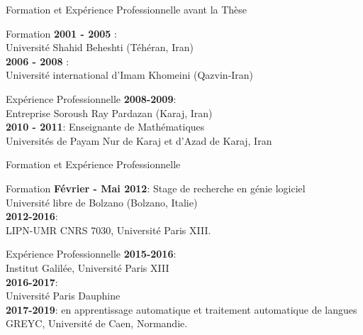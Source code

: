 \documentclass{beamer}
\newcommand{\imp}[1]{\textbf{{\color{blue}{#1}}}}
\begin{document}
{

\begin{frame}{Formation et Expérience Professionnelle avant la Thèse}

\begin{block}{Formation}
	\textbf{2001 - 2005} : \imp{Licence de Mathématique}\\
	\hspace*{1cm}Université Shahid Beheshti (Téhéran, Iran)\\
	\textbf{2006 - 2008} : \imp{Master de Mathématique} \\
	\hspace*{1cm}Université international d’Imam Khomeini (Qazvin-Iran)
\end{block}
\begin{block}{Expérience Professionnelle}
\textbf{2008-2009}: \imp{Programmatrice et conceptrice de BDD}\\
\hspace*{1cm} Entreprise Soroush Ray Pardazan (Karaj, Iran)\\
\textbf{2010 - 2011}: Enseignante de Mathématiques \\
 \hspace*{1cm} Universités de Payam Nur de Karaj et d'Azad de Karaj, Iran
\end{block}

\end{frame}

\begin{frame}{Formation et Expérience Professionnelle}

\begin{block}{Formation}
\textbf{Février - Mai 2012}: Stage de recherche en génie logiciel\\
\hspace*{1cm}Université libre de Bolzano (Bolzano, Italie)\\
\textbf{2012-2016}: \imp{Doctorat en Informatique}\\
\hspace*{1cm}LIPN-UMR CNRS 7030, Université Paris XIII.
\end{block}

\begin{block}{Expérience Professionnelle}
\textbf{2015-2016}: \imp{ATER}\\
 \hspace*{1cm}Institut Galilée, Université Paris XIII \\
\textbf{2016-2017}: \imp{ATER}\\
 \hspace*{1cm}Université Paris Dauphine\\
\textbf{2017-2019}: \imp{Post-Doctorante} en apprentissage automatique et  traitement automatique de langues\\
 \hspace*{1cm} GREYC, Université de Caen, Normandie. 
\end{block}


\end{frame}}
\end{document}
